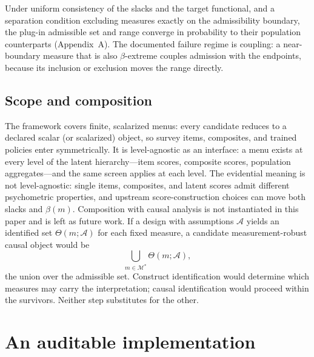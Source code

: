 \documentclass[10pt,letterpaper]{article}
\newcommand{\M}{\ensuremath{\mathcal{M}}}
\begin{document}
Under uniform consistency of the slacks and the target functional, and a separation condition excluding measures exactly on the admissibility boundary, the plug-in admissible set and range converge in probability to their population counterparts (Appendix~A).
The documented failure regime is coupling: a near-boundary measure that is also $\beta$-extreme couples admission with the endpoints, because its inclusion or exclusion moves the range directly.

\subsection{Scope and composition}
\label{sec:scope}

The framework covers finite, scalarized menus: every candidate reduces to a declared scalar (or scalarized) object, so survey items, composites, and trained policies enter symmetrically.
It is level-agnostic as an interface: a menu exists at every level of the latent hierarchy---item scores, composite scores, population aggregates---and the same screen applies at each level.
The evidential meaning is not level-agnostic: single items, composites, and latent scores admit different psychometric properties, and upstream score-construction choices can move both slacks and $\beta(m)$.
Composition with causal analysis is not instantiated in this paper and is left as future work.
If a design with assumptions $\mathcal{A}$ yields an identified set $\Theta(m;\mathcal{A})$ for each fixed measure, a candidate measurement-robust causal object would be
\begin{equation}
\bigcup_{m\in\M^*}\Theta(m;\mathcal{A}),
\label{eq:compose}
\end{equation}
the union over the admissible set.
Construct identification would determine which measures may carry the interpretation; causal identification would proceed within the survivors.
Neither step substitutes for the other.

\section{An auditable implementation}
\label{sec:impl}
\end{document}
